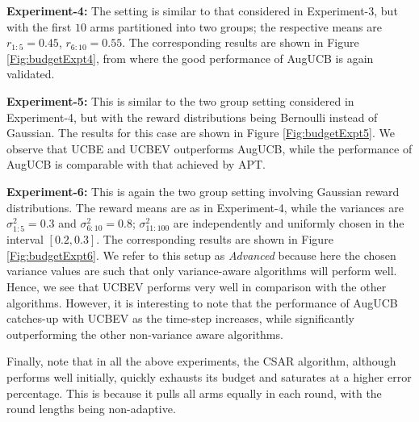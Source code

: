	
\textbf{Experiment-4:} The setting is similar to that considered in Experiment-3, but with the first $10$ arms partitioned into two groups; the respective means are $r_{1:5}=0.45$, $r_{6:10}=0.55$.
The corresponding results are shown in Figure \ref{Fig:budgetExpt4}, from where the good performance of AugUCB is again validated.

	
\textbf{Experiment-5:} 
This is similar to the two group setting considered in Experiment-4, but with the reward distributions being Bernoulli instead of Gaussian.  
The results for this case are shown in Figure \ref{Fig:budgetExpt5}. We observe that UCBE and UCBEV outperforms AugUCB, while the performance of  AugUCB is comparable with that achieved by APT.
	
\textbf{Experiment-6:} This is again the two group setting involving Gaussian reward distributions. The reward means are as in Experiment-4, while the 
variances are  $\sigma_{1:5}^{2}=0.3$ and $\sigma_{6:10}^{2}=0.8$;  $\sigma_{11:100}^{2}$ are independently and uniformly chosen in the interval $[0.2,0.3]$.  The corresponding results are shown in Figure \ref{Fig:budgetExpt6}.
 We refer to this setup as \emph{Advanced} because 
here the chosen variance values are such that only  variance-aware algorithms will perform well.
Hence, we see that UCBEV performs very well in comparison with the other algorithms. However,  it is interesting to note that the performance of  AugUCB catches-up with UCBEV as the time-step increases, while significantly outperforming the other non-variance aware algorithms.


Finally, note that in all the above experiments, the CSAR algorithm, although performs well initially, quickly exhausts its budget and saturates at a higher error percentage. This is because it pulls all arms equally in each round, with the round lengths being non-adaptive.





